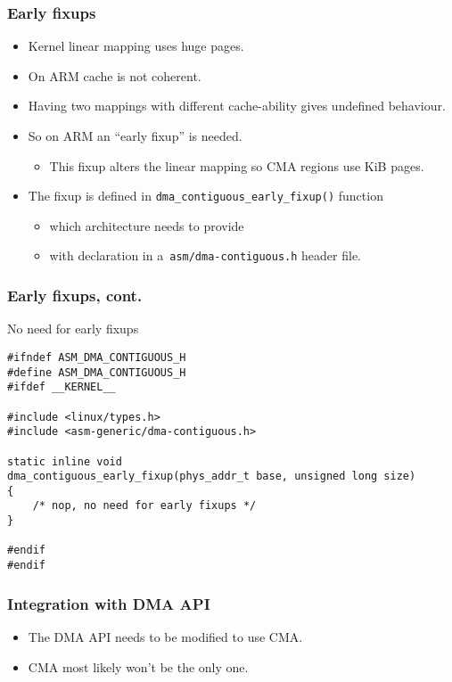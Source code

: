 \begin{frame}
  \frametitle{Early fixups}

  \begin{itemize}
  \item Kernel linear mapping uses huge pages.
  \item On ARM cache is not coherent.
  \item Having two mappings with different cache-ability gives
    undefined behaviour.
  \item So on ARM an “early fixup” is needed.
    \begin{itemize}
    \item This fixup alters the linear mapping so CMA regions use
      \unit[4]{KiB} pages.
    \end{itemize}
  \item The fixup is defined in
    \lstinline|dma_contiguous_early_fixup()| function
    \begin{itemize}
    \item which architecture needs to provide
    \item with declaration in a~\lstinline|asm/dma-contiguous.h| header file.
    \end{itemize}
  \end{itemize}
\end{frame}

\begin{frame}[fragile]
  \frametitle{Early fixups, cont.}

  \begin{block}{No need for early fixups}
\begin{lstlisting}
#ifndef ASM_DMA_CONTIGUOUS_H
#define ASM_DMA_CONTIGUOUS_H
#ifdef __KERNEL__

#include <linux/types.h>
#include <asm-generic/dma-contiguous.h>

static inline void
dma_contiguous_early_fixup(phys_addr_t base, unsigned long size)
{
    /* nop, no need for early fixups */
}

#endif
#endif
\end{lstlisting}
  \end{block}
\end{frame}

\begin{frame}
  \frametitle{Integration with DMA API}

  \begin{itemize}
  \item The DMA API needs to be modified to use CMA.
  \item CMA most likely won't be the only one.
  \end{itemize}
\end{frame}

